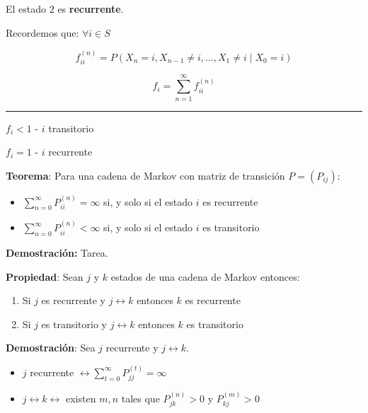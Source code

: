 \documentclass[12pt,a4paper]{article}
\newcommand{\teorema}[1]{%
\begin{teoremabox}
\textbf{Teorema}: #1
\end{teoremabox}
}
\begin{document}
El estado $2$ es \textbf{recurrente}.


\begin{mdframed}[
    backgroundcolor=blue!10,
    linecolor=blue,
    linewidth=1pt,
    roundcorner=5pt,
    innertopmargin=10pt,
    innerbottommargin=10pt,
    innerleftmargin=10pt,
    innerrightmargin=10pt
]
Recordemos que: $ \forall i \in S$

\begin{equation}
f_{ii}^{(n)} = P(X_n=i, X_{n-1} \neq i, \dots, X_1 \neq i \mid X_0=i)
\end{equation}

\begin{equation}
f_i = \sum_{n=1}^{\infty} f_{ii}^{(n)}
\end{equation}

\rule{0.4\textwidth}{0.4pt}

$f_i < 1$ - $i$ transitorio

$f_i = 1$ - $i$ recurrente
\end{mdframed}


\teorema{Para una cadena de Markov con matriz de transición $P = (P_{ij})$:
\begin{itemize}
    \item $\sum_{n=0}^{\infty} P_{ii}^{(n)} = \infty$ si, y solo si el estado $i$ es recurrente
    \item $\sum_{n=0}^{\infty} P_{ii}^{(n)} < \infty$ si, y solo si el estado $i$ es transitorio
\end{itemize}}

\textbf{Demostración:} Tarea.

\textbf{Propiedad}: Sean $j$ y $k$ estados de una cadena de Markov entonces:

\begin{enumerate}
    \item Si $j$ es recurrente y $j \leftrightarrow k$ entonces $k$ es recurrente
    \item Si $j$ es transitorio y $j \leftrightarrow k$ entonces $k$ es transitorio
\end{enumerate}

\textbf{Demostración}: Sea $j$ recurrente y $j \leftrightarrow k$.

\begin{itemize}
    \item $j$ recurrente $\leftrightarrow \sum_{t=0}^{\infty} P_{jj}^{(t)} = \infty$
    \item $j \leftrightarrow k \leftrightarrow$ existen $m, n$ tales que $P_{jk}^{(n)} > 0$ y $P_{kj}^{(m)} > 0$
\end{itemize}
\end{document}

